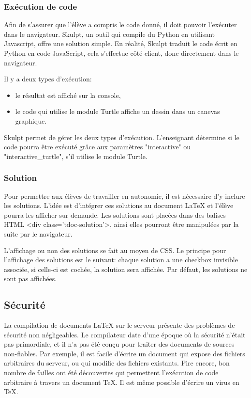 \documentclass[12pt,titlepage,oneside]{article}
\renewcommand{\footnote}[1]{}
\begin{document}
\subsubsection{Exécution de code}
Afin de s'assurer que l'élève a compris le code donné, il doit pouvoir l'exécuter dans le navigateur. Skulpt\footnote{\url{https://skulpt.org/}}, un outil qui compile du Python en utilisant Javascript, offre une solution simple. En réalité, Skulpt traduit le code écrit en Python en code JavaScript, cela s'effectue côté client, donc directement dans le navigateur. \par
Il y a deux types d'exécution:
\begin{itemize}
\item le résultat est affiché sur la console,
\item le code qui utilise le module Turtle\footnote{\url{https://docs.python.org/3/library/turtle.html}} affiche un dessin dans un canevas graphique.
\end{itemize}
Skulpt permet de gérer les deux types d'exécution. L'enseignant détermine si le code pourra être exécuté grâce aux paramètres "interactive" ou "interactive\_turtle", s'il utilise le module Turtle.

\subsubsection{Solution}
Pour permettre aux élèves de travailler en autonomie, il est nécessaire d'y inclure les solutions. L'idée est d'intégrer ces solutions au document LaTeX et l'élève pourra les afficher sur demande. Les solutions sont placées dans des balises HTML <div class='tdoc-solution'>, ainsi elles pourront être manipulées par la suite par le navigateur.\par

L'affichage ou non des solutions se fait au moyen de CSS. Le principe pour l'affichage des solutions est le suivant: chaque solution a une checkbox invisible associée, si celle-ci est cochée, la solution sera affichée. Par défaut, les solutions ne sont pas affichées.

\subsection{Sécurité}
La compilation de documents LaTeX sur le serveur présente des problèmes de sécurité non négligeables. Le compilateur date d'une époque où la sécurité n'était pas primordiale, et il n'a pas été conçu pour traiter des documents de sources non-fiables. Par exemple, il est facile d'écrire un document qui expose des fichiers arbitraires du serveur, ou qui modifie des fichiers existants. Pire encore, bon nombre de failles ont été découvertes qui permettent l'exécution de code arbitraire à travers un document TeX.\footnote{Exemples \url{https://nvd.nist.gov/vuln/detail/CVE-2016-10243}, \url{https://nvd.nist.gov/vuln/detail/CVE-2018-17407}} Il est même possible d'écrire un virus en TeX.\footnote{\url{https://www.usenix.org/system/files/login/articles/73506-checkoway.pdf}}\par
\end{document}
